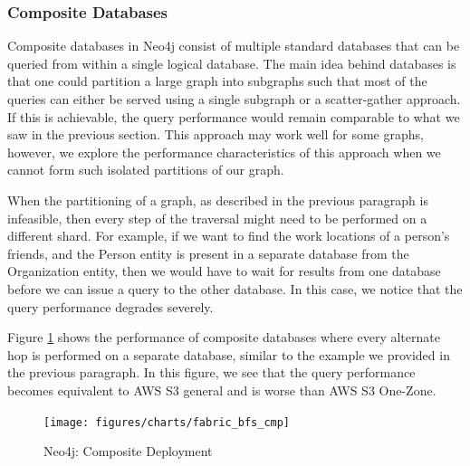 \subsubsection{Composite Databases}
Composite databases in Neo4j consist of multiple standard databases that can be
queried from within a single logical database. The main idea
behind databases is that one could partition a large graph into
subgraphs such that most of the queries can either be served using a single subgraph or
a scatter-gather approach. If this is achievable, the query 
performance would remain 
comparable to what we saw in the previous section. This approach may work well
for some graphs, however, we explore the performance characteristics of this
approach when we cannot form such isolated partitions of our graph.

\smallskip
When the partitioning of a graph, as described in the previous paragraph is
infeasible, then every step of the traversal might need to be
performed on a different shard. For example, if we want to find the work
locations of a person's friends, and the Person entity is present in a separate
database from the Organization entity, then we would have to wait for results
from one database before we can issue a query to the other database. In this
case, we notice that the query performance degrades severely.

\smallskip
Figure \ref{fig:neoFabricCmp} shows the performance of composite databases where
every alternate hop is performed on a separate database, similar to the example
we provided in the previous paragraph. In this figure, we see that the query
performance becomes equivalent to AWS S3 general and is worse than AWS S3 One-Zone.
\begin{figure}[ht]
    \centering
    \texttt{[image: figures/charts/fabric\_bfs\_cmp]}
    \caption{Neo4j: Composite Deployment}
    \label{fig:neoFabricCmp}
\end{figure}

